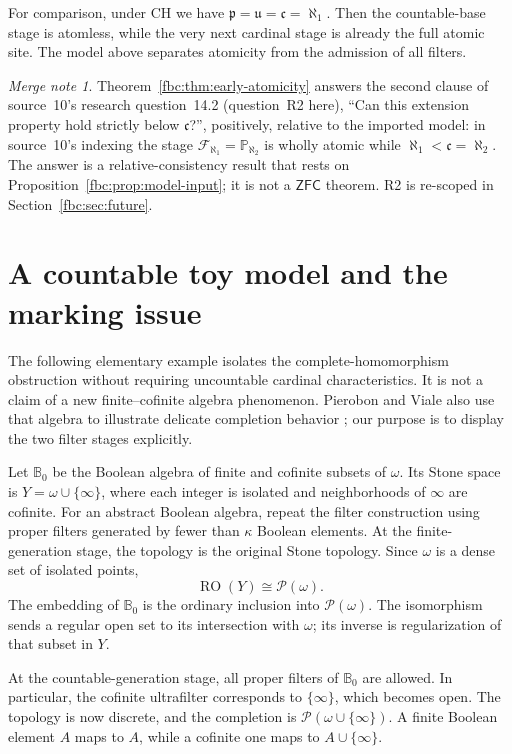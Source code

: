 \documentclass[11pt,letterpaper]{article}
\theoremstyle{definition}
\theoremstyle{remark}
\newtheorem*{mergenote}{Merge note}
\newcommand{\om}{\omega}
\newcommand{\B}{\mathbb B}
\newcommand{\PP}{\mathbb P}
\newcommand{\pow}{\mathcal P}
\newcommand{\cp}{\mathfrak p}
\newcommand{\cu}{\mathfrak u}
\newcommand{\cc}{\mathfrak c}
\newcommand{\RO}{\operatorname{RO}}
\newcommand{\ZFC}{\mathsf{ZFC}}
\begin{document}
For comparison, under CH we have $\cp=\cu=\cc=\aleph_1$.
Then the countable-base stage is atomless, while the very next cardinal
stage is already the full atomic site. The model above separates
atomicity from the admission of all filters.

\begin{mergenote}
Theorem~\ref{fbc:thm:early-atomicity} answers the second clause of
source~10's research question~14.2 (question~R2 here), ``Can this
extension property hold strictly below $\cc$?'', positively, relative to
the imported model: in source~10's indexing the stage
$\mathcal F_{\aleph_1}=\PP_{\aleph_2}$ is wholly atomic while
$\aleph_1<\cc=\aleph_2$. The answer is a relative-consistency result that
rests on Proposition~\ref{fbc:prop:model-input}; it is not a $\ZFC$
theorem. R2 is re-scoped in Section~\ref{fbc:sec:future}.
\end{mergenote}

\section{A countable toy model and the marking issue}
\label{fbc:sec:toy}

The following elementary example isolates the complete-homomorphism
obstruction without requiring uncountable cardinal characteristics.
It is not a claim of a new finite--cofinite algebra phenomenon.
Pierobon and Viale also use that algebra to illustrate delicate
completion behavior \cite[Remark~3.7]{PV}; our purpose is to display
the two filter stages explicitly.

Let $\B_0$ be the Boolean algebra of finite and cofinite subsets of
$\om$. Its Stone space is $Y=\om\cup\{\infty\}$, where each
integer is isolated and neighborhoods of $\infty$ are cofinite.
For an abstract Boolean algebra, repeat the filter construction using
proper filters generated by fewer than $\kappa$ Boolean elements.
At the finite-generation stage, the topology is the original Stone
topology. Since $\om$ is a dense set of isolated points,
\[
 \RO(Y)\cong\pow(\om).
\]
The embedding of $\B_0$ is the ordinary inclusion into $\pow(\om)$.
The isomorphism sends a regular open set to its intersection with
$\om$; its inverse is regularization of that subset in $Y$.

At the countable-generation stage, all proper filters of $\B_0$
are allowed. In particular, the cofinite ultrafilter corresponds to
$\{\infty\}$, which becomes open. The topology is now discrete,
and the completion is $\pow(\om\cup\{\infty\})$. A finite Boolean
element $A$ maps to $A$, while a cofinite one maps to
$A\cup\{\infty\}$.
\end{document}
